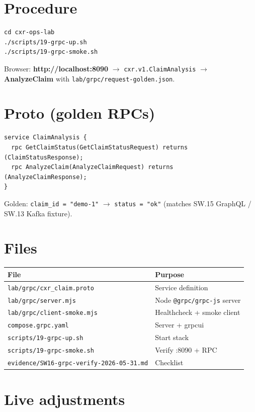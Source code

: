 \documentclass[11pt,a4paper]{report}
\begin{document}
\chapter{Procedure}

\begin{lstlisting}[style=bash]
cd cxr-ops-lab
./scripts/19-grpc-up.sh
./scripts/19-grpc-smoke.sh
\end{lstlisting}

Browser: \textbf{http://localhost:8090} $\rightarrow$ \texttt{cxr.v1.ClaimAnalysis} $\rightarrow$
\textbf{AnalyzeClaim} with \texttt{lab/grpc/request-golden.json}.

\chapter{Proto (golden RPCs)}

\begin{lstlisting}[style=proto]
service ClaimAnalysis {
  rpc GetClaimStatus(GetClaimStatusRequest) returns (ClaimStatusResponse);
  rpc AnalyzeClaim(AnalyzeClaimRequest) returns (AnalyzeClaimResponse);
}
\end{lstlisting}

Golden: \texttt{claim\_id = "demo-1"} $\rightarrow$ \texttt{status = "ok"} (matches SW.15 GraphQL / SW.13 Kafka fixture).

\chapter{Files}

\begin{longtable}{@{}p{5cm}p{8cm}@{}}
\toprule
File & Purpose \\
\midrule
\endhead
\texttt{lab/grpc/cxr\_claim.proto} & Service definition \\
\texttt{lab/grpc/server.mjs} & Node \texttt{@grpc/grpc-js} server \\
\texttt{lab/grpc/client-smoke.mjs} & Healthcheck + smoke client \\
\texttt{compose.grpc.yaml} & Server + grpcui \\
\texttt{scripts/19-grpc-up.sh} & Start stack \\
\texttt{scripts/19-grpc-smoke.sh} & Verify :8090 + RPC \\
\texttt{evidence/SW16-grpc-verify-2026-05-31.md} & Checklist \\
\bottomrule
\end{longtable}

\chapter{Live adjustments}
\end{document}
